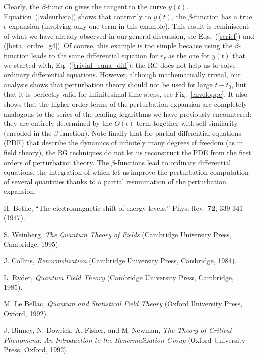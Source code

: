 \documentclass[floatfix,preprintnumbers,amsmath,amssymb,prb,12pt]{revtex4-1}
\begin{document}
{{Clearly, the $\beta$-function gives the tangent to the curve
$y(t)$. Equation~(\ref{valeurbeta}) shows that contrarily to
$y(t)$, the
$\beta$-function has a true $\epsilon$-expansion (involving only
one term
in this example). 
This result is reminiscent of what we have already observed
in our general discussion, see Eqs.~(\ref{serief}) and
(\ref{beta_ordre_g4}). Of course, this example is too simple
because using the $\beta$-function leads to the same 
differential equation for $r_\tau$ as the one for $y(t)$ that we
started with, Eq.~(\ref{trivial_equa_diff}): the RG does not help
us to solve ordinary differential equations. 
However, although mathematically trivial, our analysis
shows that perturbation theory should not be used for large
$t-t_0$, but that it is perfectly valid for infinitesimal time
steps, see Fig.~\ref{enveloppe}. It also shows that
the higher order terms of the perturbation expansion are
completely analogous to the series of the leading logarithms we
have previously encountered: they are entirely determined by the
$O(\epsilon)$ term together with self-similarity (encoded in the
$\beta$-function). Note finally that for partial differential
equations (PDE) that describe the dynamics of infinitely many
degrees of freedom (as in field theory), the RG techniques do not
let us reconstruct the PDE from the first orders of perturbation
theory. The $\beta$-functions lead to ordinary
differential equations, the integration of which let us improve the
perturbation computation of several quantities thanks to a partial
resummation of the perturbation
expansion.\cite{shirkov01,kovalev99}

\begin{thebibliography}{10}

H. Bethe, ``The electromagnetic shift of energy levels,'' Phys.
Rev. \textbf{72}, 339-341 (1947). 

 S. Weinberg,
\emph{The Quantum Theory of Fields} (Cambridge University Press,
Cambridge, 1995).

J. Collins,
\emph{Renormalization} (Cambridge University Press, Cambridge,
1984).

L. Ryder,
\emph{Quantum Field Theory} (Cambridge
University Press, Cambridge, 1985).

 M. Le Bellac,
\emph{Quantum and Statistical Field Theory} (Oxford University
Press, Oxford, 1992).

 J. Binney, N. Dowrick, A. Fisher, and M. Newman,
\emph{The Theory of Critical Phenomena: An Introduction to the
Renormalization Group} (Oxford University Press, Oxford, 1992).


\end{thebibliography}}}
\end{document}
